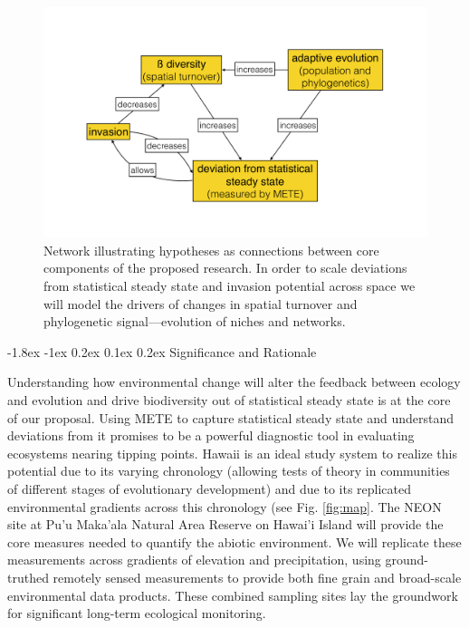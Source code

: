 \documentclass[11pt]{article}
\makeatletter
\renewcommand\subsection{\@startsection{subsection}{1}{\z@}%
                                  {-1.8ex \@plus -1ex \@minus 0.2ex}%
                                  {0.1ex \@plus 0.2ex}%
                                  {\normalfont\large\bfseries}}
\makeatother
\begin{document}
\begin{figure}[!htb]
  \centering
  \includegraphics[scale=0.3]{../figs/fig_concept.pdf}
  \caption{Network illustrating hypotheses as connections between core
    components of the proposed research. In order to scale deviations
    from statistical steady state and invasion potential across space
    we will model the drivers of changes in spatial turnover and
    phylogenetic signal---evolution of niches and networks.}
  \label{fig:concept}
\end{figure}

\subsection{Significance and Rationale}

Understanding how environmental change will alter the feedback between
ecology and evolution and drive biodiversity out of statistical steady
state is at the core of our proposal.  Using METE to capture
statistical steady state and understand deviations from it promises to
be a powerful diagnostic tool in evaluating ecosystems nearing tipping
points.  Hawaii is an ideal study system to realize this potential due
to its varying chronology (allowing tests of theory in communities of
different stages of evolutionary development) and due to its
replicated environmental gradients across this chronology (see
Fig. \ref{fig:map}. The NEON site at Pu'u Maka'ala Natural Area Reserve
on Hawai'i Island will provide the core measures needed to quantify
the abiotic environment.  We will replicate these measurements across
gradients of elevation and precipitation, using ground-truthed
remotely sensed measurements to provide both fine grain and
broad-scale environmental data products.  These combined sampling
sites lay the groundwork for significant long-term ecological
monitoring.
\end{document}
